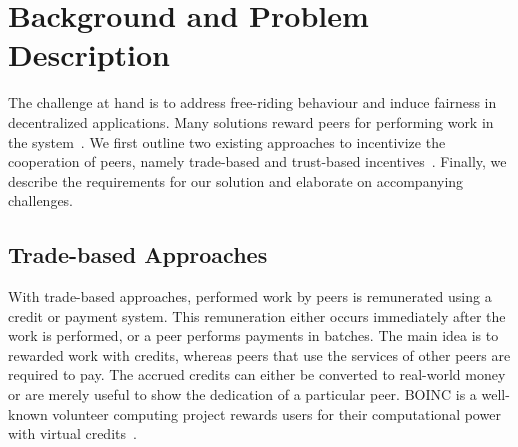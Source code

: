 



\section{Background and Problem Description}
The challenge at hand is to address free-riding behaviour and induce fairness in decentralized applications.
Many solutions reward peers for performing work in the system~\cite{ma2004incentive}.
We first outline two existing approaches to incentivize the cooperation of peers, namely trade-based and trust-based incentives~\cite{ruffo2007fairpeers}.
Finally, we describe the requirements for our solution and elaborate on accompanying challenges.

\subsection{Trade-based Approaches}
With trade-based approaches, performed work by peers is remunerated using a credit or payment system.
This remuneration either occurs immediately after the work is performed, or a peer performs payments in batches.
The main idea is to rewarded work with credits, whereas peers that use the services of other peers are required to pay.
The accrued credits can either be converted to real-world money or are merely useful to show the dedication of a particular peer.
BOINC is a well-known volunteer computing project rewards users for their computational power with virtual credits~\cite{anderson2019boinc}.

